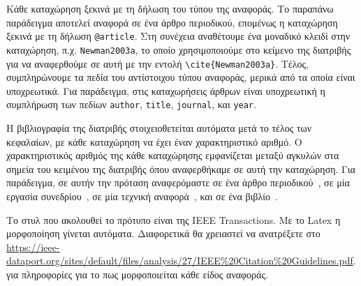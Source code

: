 Κάθε καταχώρηση ξεκινά με τη δήλωση του τύπου της αναφοράς. Το παραπάνω 
παράδειγμα αποτελεί αναφορά σε ένα άρθρο περιοδικού, επομένως η καταχώρηση 
ξεκινά με τη δήλωση \verb|@article|. Στη συνέχεια αναθέτουμε ένα μοναδικό 
κλειδί στην καταχώρηση, π.χ. \verb|Newman2003a|, το οποίο χρησιμοποιούμε 
στο κείμενο της διατριβής για να αναφερθούμε σε αυτή με την εντολή 
\verb|\cite{Newman2003a}|. Τέλος, συμπληρώνουμε τα πεδία του αντίστοιχου 
τύπου αναφοράς, μερικά από τα οποία είναι υποχρεωτικά. Για παράδειγμα, στις 
καταχωρήσεις άρθρων είναι υποχρεωτική η συμπλήρωση των πεδίων \verb|author|, 
\verb|title|, \verb|journal|, και \verb|year|.

Η βιβλιογραφία της διατριβής στοιχειοθετείται αυτόματα μετά το τέλος των 
κεφαλαίων, με κάθε καταχώρηση να έχει έναν χαρακτηριστικό αριθμό.
Ο χαρακτηριστικός αριθμός της κάθε καταχώρησης εμφανίζεται μεταξύ αγκυλών 
στα σημεία του κειμένου της διατριβής όπου αναφερθήκαμε σε αυτή την καταχώρηση.
Για παράδειγμα, σε αυτήν την πρόταση αναφερόμαστε σε ένα άρθρο 
περιοδικού~\cite{Newman2003a}, σε μία εργασία συνεδρίου~\cite{DeCandia2007a}, 
σε μία τεχνική αναφορά~\cite{Jain1984a}, και σε ένα βιβλίο~\cite{Golumbic2004a}.

Το στυλ που ακολουθεί το πρότυπο είναι της IEEE Transactions.
Με το Latex η μορφοποίηση γίνεται αυτόματα.
Διαφορετικά θα χρειαστεί να ανατρέξετε στο
\url{https://ieee-dataport.org/sites/default/files/analysis/27/IEEE%20Citation%20Guidelines.pdf}.
για πληροφορίες για το πως μορφοποιείται κάθε είδος αναφοράς.


